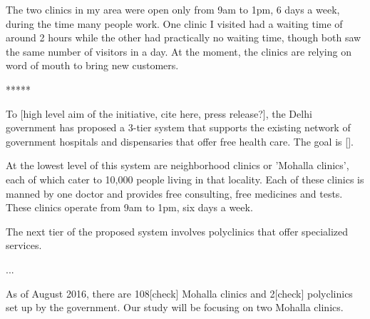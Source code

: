 The two clinics in my area were open only from 9am to 1pm, 6 days a week, during the time many people work. One clinic I visited had a waiting time of around 2 hours while the other had practically no waiting time, though both saw the same number of visitors in a day. At the moment, the clinics are relying on word of mouth to bring new customers. 

*****

To [high level aim of the initiative, cite here, press release?], the Delhi government has proposed a 3-tier system that supports the existing network of government hospitals and dispensaries that offer free health care. The goal is [].

At the lowest level of this system are neighborhood clinics or 'Mohalla clinics', each of which cater to 10,000 people living in that locality. Each of these clinics is manned by one doctor and provides free consulting, free medicines and tests. These clinics operate from 9am to 1pm, six days a week.

The next tier of the proposed system involves polyclinics that offer specialized services.

...

As of August 2016, there are 108[check] Mohalla clinics and 2[check] polyclinics set up by the government. Our study will be focusing on two Mohalla clinics. 